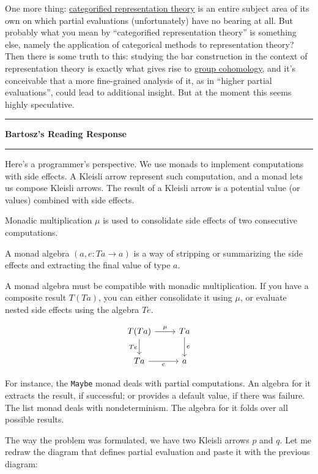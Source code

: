 \documentclass{amsart}
\newcommand{\iam}[1]{
  \vspace{0.25em}
  \hrule
  \vspace{0.25em}
  \textbf{{#1}'s Reading Response}
  \vspace{0.25em}
  \hrule
  \vspace{1em}
}
\begin{document}
One more thing: \href{https://ncatlab.org/nlab/show/categorification+in+representation+theory}{categorified representation theory} is an entire subject area of its own on which partial evaluations (unfortunately) have no bearing at all. But probably what you mean by ``categorified representation theory'' is something else, namely the application of categorical methods to representation theory? Then there is some truth to this: studying the bar construction in the context of representation theory is exactly what gives rise to \href{https://en.wikipedia.org/wiki/Group_cohomology}{group cohomology}, and it's conceivable that a more fine-grained analysis of it, as in ``higher partial evaluations'', could lead to additional insight. But at the moment this seems highly speculative.



\iam{Bartosz}

Here's a programmer's perspective. We use monads to implement computations with side effects. A Kleisli arrow represent such computation, and a monad lets us compose Kleisli arrows. The result of a Kleisli arrow is a potential value (or values) combined with side effects.

Monadic multiplication $\mu$ is used to consolidate side effects of two consecutive computations.


A monad algebra $(a, e : T a \to a)$ is a way of stripping or summarizing the side effects and extracting the final value of type $a$.

A monad algebra must be compatible with monadic multiplication. If you have a composite result $T(T a)$, you can either consolidate it using $\mu$, or evaluate nested side effects using the algebra $T e$.

\begin{equation*}
\begin{tikzcd}
T(T a)
\arrow[r, "\mu"]
\arrow[d, "T e"']
& T a
\arrow[d, "e"]
\\
T a
\arrow[r, "e"']
& a
\end{tikzcd}
\end{equation*}


For instance, the \verb|Maybe| monad deals with partial computations. An algebra for it extracts the result, if successful; or provides a default value, if there was failure. The list monad deals with nondeterminism. The algebra for it folds over all possible results.


The way the problem was formulated, we have two Kleisli arrows $p$ and $q$. Let me redraw the diagram that defines partial evaluation and paste it with the previous diagram:
\end{document}

